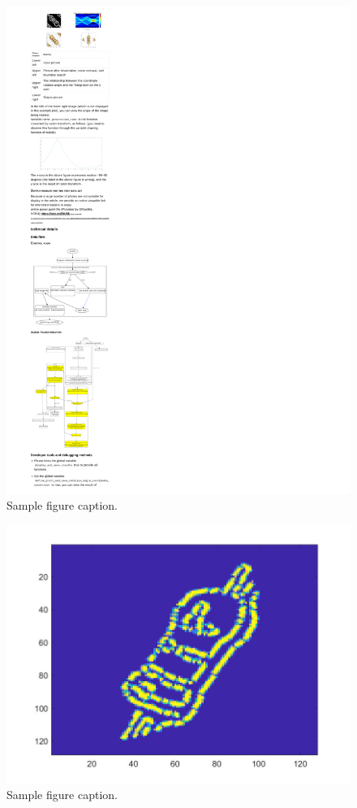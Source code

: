 \documentclass{article}
\begin{document}
\begin{figure}
	\centering
	\includegraphics[width=0.7\linewidth]{f.pdf}
	\caption{Sample figure caption.}
	\label{fig:fpdf}
\end{figure}




\begin{figure}
	\centering
	\includegraphics[width=0.7\linewidth]{6AdnkBj.jpg}
	\caption{Sample figure caption.}
	\label{fig:6AdnkBj}
\end{figure}
\end{document}

